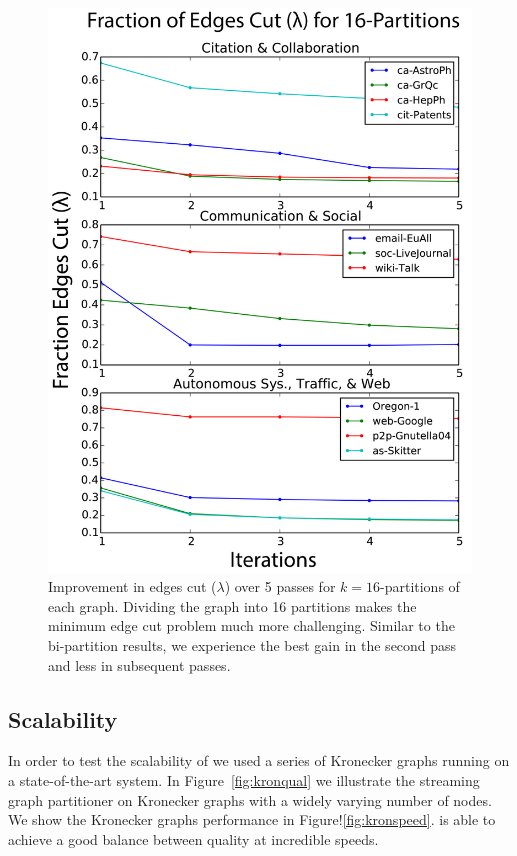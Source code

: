 \begin{figure}[t!]
\centering
\includegraphics[width=0.9\columnwidth] {figures/real_k16_lambda.pdf}
\caption[Caption for]{Improvement in edges cut ($\lambda$) over 5 passes for $k=16$-partitions of each graph. Dividing the graph into 16 partitions makes the minimum edge cut problem much more challenging. Similar to the bi-partition results, we experience the best gain in the second pass and less in subsequent passes.}
\label{fig:k16_lambda}
\end{figure}


\subsection{Scalability}
In order to test the scalability of \ourmethod we used a series of Kronecker graphs running on a state-of-the-art system.
In Figure~\ref{fig:kronqual} we illustrate the streaming graph partitioner on Kronecker graphs with a widely varying number of nodes.
We show the Kronecker graphs performance in Figure!\ref{fig:kronspeed}. 
\ourmethod is able to achieve a good balance between quality at incredible speeds.



